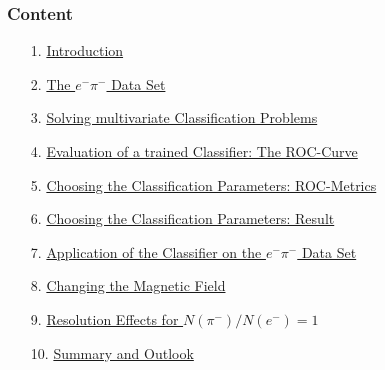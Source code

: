 \documentclass[xcolor=table, xcolor=dvipsnames]{beamer}
\begin{document}

\begin{frame}
  \frametitle{Content}
  \label{con}
  \footnotesize
  
  \begin{itemize}
    \item[1.] \hyperlink{intro}{Introduction} {\color{blue}{(\ref{intro})}}
    \item[2.] \hyperlink{dataSet}{The $e^{-}\pi^{-}$ Data Set} {\color{blue}{(\ref{dataSet})}}
    \item[3.] \hyperlink{classi}{Solving multivariate Classification Problems}  {\color{blue}{(\ref{classi})}} 
    \item[4.] \hyperlink{rocCurve}{Evaluation of a trained Classifier: The ROC-Curve}  {\color{blue}{(\ref{rocCurve})}} 
    \item[5.] \hyperlink{rocMetric}{Choosing the Classification Parameters: ROC-Metrics}  {\color{blue}{(\ref{rocMetric})}} 
    \item[6.] \hyperlink{rocRes}{Choosing the Classification Parameters: Result}  {\color{blue}{(\ref{rocRes})}} 
    \item[7.] \hyperlink{app}{Application of the Classifier on the $e^{-}\pi^{-}$ Data Set}  {\color{blue}{(\ref{app})}} 
    \item[8.] \hyperlink{mField}{Changing the Magnetic Field} {\color{blue}{(\ref{mField})}} 
    \item[9.] \hyperlink{smear}{Resolution Effects for $N(\pi^{-}) / N(e^{-}) = 1$}  {\color{blue}{(\ref{smear})}} 
    \item[10.] \hyperlink{fin}{Summary and Outlook} {\color{blue}{(\ref{fin})}} 
  \end{itemize}
\end{frame}
\end{document}
